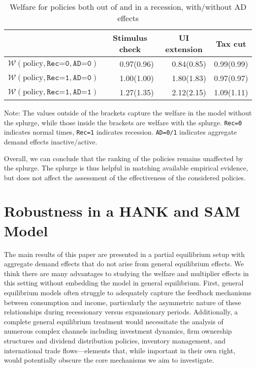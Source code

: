 \documentclass[qe]{econsocart}
\begin{document}
\begin{table}[tb] 
  \caption{Welfare for policies both out of and in a recession, with/without AD effects}
  \label{tab:welfare6-SplurgeComp} 
  \centering

  \begin{tabular*}
    {\textwidth}{@{\extracolsep{\fill}}lrrr@{}} 
    \hline
    & \multicolumn{1}{c}{Stimulus check} & \multicolumn{1}{c}{UI extension} & \multicolumn{1}{c}{Tax cut} \\ \hline
    $\mathcal{W}(\text{policy}, \texttt{Rec=0}, \texttt{AD=0})$ & 0.97(0.96) & 0.84(0.85) & 0.99(0.99) \\
    $\mathcal{W}(\text{policy}, \texttt{Rec=1}, \texttt{AD=0})$ & 1.00(1.00) & 1.80(1.83) & 0.97(0.97) \\
    $\mathcal{W}(\text{policy}, \texttt{Rec=1}, \texttt{AD=1})$ & 1.27(1.35) & 2.12(2.15) & 1.09(1.11) \\
    \hline
  \end{tabular*}

  \noindent\parbox{\textwidth}{
    \medskip
    \footnotesize Note: The values outside of the brackets capture the welfare in the model without the splurge, while those inside the brackets are welfare with the splurge. \texttt{Rec=0} indicates normal times, \texttt{Rec=1} indicates recession. \texttt{AD=0/1} indicates aggregate demand effects inactive/active.
  }
\end{table}

\vspace{0.5em}

Overall, we can conclude that the ranking of the policies remains unaffected by the splurge.
The splurge is thus helpful in matching available empirical evidence, but does not affect the assessment of the effectiveness of the considered policies.

\FloatBarrier
\section{Robustness in a HANK and SAM Model}
\label{sec:hank} 

The main results of this paper are presented in a partial equilibrium setup with aggregate demand effects that do not arise from general equilibrium effects. We think there are many advantages to studying the welfare and multiplier effects in this setting without embedding the model in general equilibrium.  First, general equilibrium models often struggle to adequately capture the feedback mechanisms between consumption and income, particularly the asymmetric nature of these relationships during recessionary versus expansionary periods. Additionally, a complete general equilibrium treatment would necessitate the analysis of numerous complex channels including investment dynamics, firm ownership structures and dividend distribution policies, inventory management, and international trade flows—elements that, while important in their own right, would potentially obscure the core mechanisms we aim to investigate.
\end{document}
